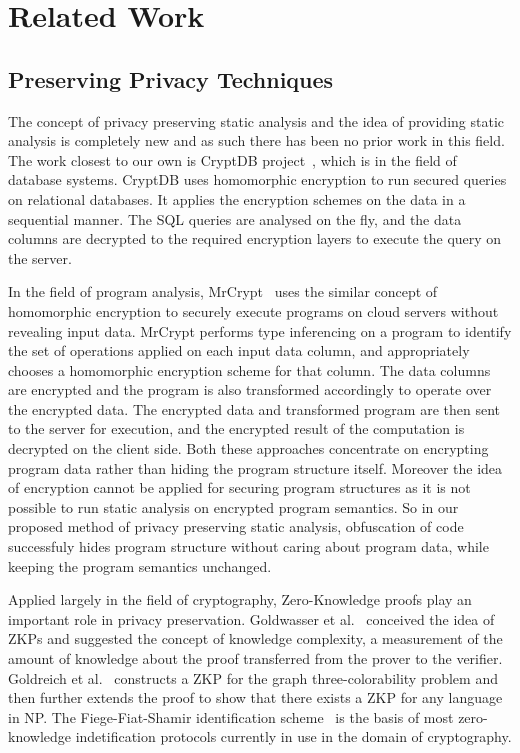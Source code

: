 \documentclass[twocolumn]{article}
\begin{document}
\section{Related Work}
\subsection{Preserving Privacy Techniques}
The concept of privacy preserving static analysis and the idea of providing static analysis is completely new and as such there has been no prior work in this field. The work closest 
to our own is CryptDB project~\cite{cryptdb}, which is in the field of database systems. CryptDB uses homomorphic encryption to run secured queries on relational databases. It applies 
the encryption schemes on the data in a sequential manner. The SQL queries are analysed on the fly, and the data columns 
are decrypted to the required encryption layers to execute the query on the server. 

In the field of program analysis, MrCrypt~\cite{mrcrypt} uses the similar concept of homomorphic 
encryption to securely execute programs on cloud servers without revealing input data. MrCrypt performs type inferencing on a program to identify the set of operations applied on each input data 
column, and appropriately chooses a homomorphic encryption scheme for that column. The data columns are encrypted and the program is also transformed accordingly to operate over 
the encrypted data. The encrypted data and transformed program are then sent to the server for execution, and the encrypted result of the computation is decrypted on the client side. 
Both these approaches concentrate on encrypting program data rather than hiding the program structure itself. Moreover the idea of encryption cannot be applied for securing 
program structures as it is not possible to run static analysis on encrypted program semantics. So in our proposed method of privacy preserving static analysis, obfuscation of code 
successfuly hides program structure without caring about program data, while keeping the program semantics unchanged.

Applied largely in the field of cryptography, Zero-Knowledge proofs play an important role in privacy preservation. Goldwasser et al.~\cite{Goldwasser} conceived the idea of ZKPs 
and suggested the concept of knowledge complexity, a measurement of the amount of knowledge about the proof transferred from the prover to the verifier. Goldreich et al.~\cite{Goldreich} 
constructs a ZKP for the graph three-colorability problem and then further extends the proof to show that there exists a ZKP for any language in NP. The Fiege-Fiat-Shamir identification 
scheme~\cite{Fiege} is the basis of most zero-knowledge indetification protocols currently in use in the domain of cryptography.
\end{document}
